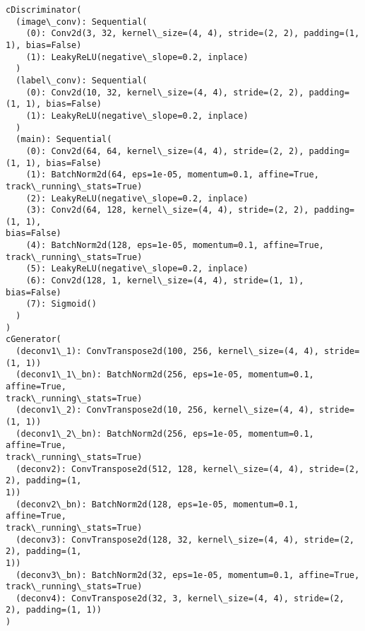\documentclass[11pt]{article}
\begin{document}
    \begin{Verbatim}[commandchars=\\\{\},fontsize=\footnotesize]
cDiscriminator(
  (image\_conv): Sequential(
    (0): Conv2d(3, 32, kernel\_size=(4, 4), stride=(2, 2), padding=(1, 1), bias=False)
    (1): LeakyReLU(negative\_slope=0.2, inplace)
  )
  (label\_conv): Sequential(
    (0): Conv2d(10, 32, kernel\_size=(4, 4), stride=(2, 2), padding=(1, 1), bias=False)
    (1): LeakyReLU(negative\_slope=0.2, inplace)
  )
  (main): Sequential(
    (0): Conv2d(64, 64, kernel\_size=(4, 4), stride=(2, 2), padding=(1, 1), bias=False)
    (1): BatchNorm2d(64, eps=1e-05, momentum=0.1, affine=True,
track\_running\_stats=True)
    (2): LeakyReLU(negative\_slope=0.2, inplace)
    (3): Conv2d(64, 128, kernel\_size=(4, 4), stride=(2, 2), padding=(1, 1),
bias=False)
    (4): BatchNorm2d(128, eps=1e-05, momentum=0.1, affine=True,
track\_running\_stats=True)
    (5): LeakyReLU(negative\_slope=0.2, inplace)
    (6): Conv2d(128, 1, kernel\_size=(4, 4), stride=(1, 1), bias=False)
    (7): Sigmoid()
  )
)
cGenerator(
  (deconv1\_1): ConvTranspose2d(100, 256, kernel\_size=(4, 4), stride=(1, 1))
  (deconv1\_1\_bn): BatchNorm2d(256, eps=1e-05, momentum=0.1, affine=True,
track\_running\_stats=True)
  (deconv1\_2): ConvTranspose2d(10, 256, kernel\_size=(4, 4), stride=(1, 1))
  (deconv1\_2\_bn): BatchNorm2d(256, eps=1e-05, momentum=0.1, affine=True,
track\_running\_stats=True)
  (deconv2): ConvTranspose2d(512, 128, kernel\_size=(4, 4), stride=(2, 2), padding=(1,
1))
  (deconv2\_bn): BatchNorm2d(128, eps=1e-05, momentum=0.1, affine=True,
track\_running\_stats=True)
  (deconv3): ConvTranspose2d(128, 32, kernel\_size=(4, 4), stride=(2, 2), padding=(1,
1))
  (deconv3\_bn): BatchNorm2d(32, eps=1e-05, momentum=0.1, affine=True,
track\_running\_stats=True)
  (deconv4): ConvTranspose2d(32, 3, kernel\_size=(4, 4), stride=(2, 2), padding=(1, 1))
)

    \end{Verbatim}
\end{document}
